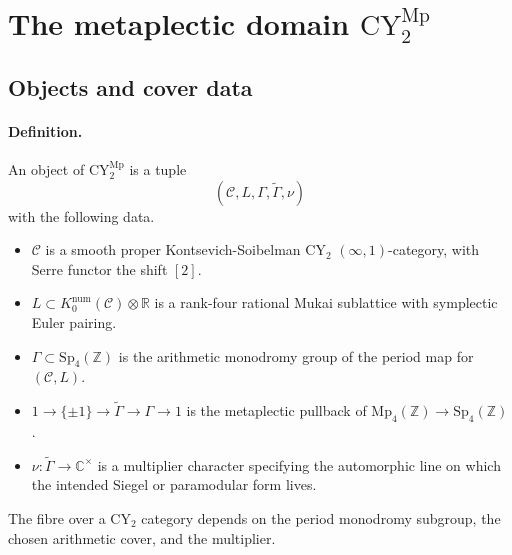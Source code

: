 \providecommand{\Sp}{\mathrm{Sp}}
\providecommand{\Mp}{\mathrm{Mp}}
\providecommand{\Z}{\mathbb{Z}}
\providecommand{\Q}{\mathbb{Q}}
\providecommand{\R}{\mathbb{R}}
\providecommand{\C}{\mathbb{C}}
\providecommand{\CY}{\mathrm{CY}}
\providecommand{\SVOA}{\mathrm{SVOA}}
\providecommand{\VOA}{\mathrm{VOA}}
\providecommand{\NS}{\mathrm{NS}}
\providecommand{\ChirAlg}{\mathrm{ChirAlg}}
\providecommand{\Per}{\mathrm{Per}}
\providecommand{\Aut}{\mathrm{Aut}}
\providecommand{\id}{\mathrm{id}}
\providecommand{\Mod}{\mathrm{Mod}}
\providecommand{\kBKM}{\kappa_{\mathrm{BKM}}}
\providecommand{\Phisup}{\Phi^{\mathrm{sup}}}
\providecommand{\CYMp}{\CY_2^{\Mp}}
\providecommand{\CYint}{\CY_2^{\mathrm{int}}}
\providecommand{\CYhalf}{\CY_2^{\mathrm{half}}}
\providecommand{\cC}{\mathcal{C}}
\providecommand{\cK}{\mathcal{K}}
\providecommand{\cL}{\mathcal{L}}

\section{The metaplectic domain \(\CYMp\)}
\label{sec:CY2-Mp-domain}

\subsection*{Objects and cover data}

\paragraph{Definition.}
An object of \(\CYMp\) is a tuple
\[
  (\cC,L,\Gamma,\widetilde{\Gamma},\nu)
\]
with the following data.
\begin{itemize}
\item \(\cC\) is a smooth proper Kontsevich-Soibelman CY\(_2\)
  \((\infty,1)\)-category, with Serre functor the shift \([2]\).
\item \(L\subset K_0^{\mathrm{num}}(\cC)\otimes\R\) is a rank-four
  rational Mukai sublattice with symplectic Euler pairing.
\item \(\Gamma\subset\Sp_4(\Z)\) is the arithmetic monodromy group of
  the period map for \((\cC,L)\).
\item
  \(1\to\{\pm1\}\to\widetilde{\Gamma}\to\Gamma\to1\)
  is the metaplectic pullback of \(\Mp_4(\Z)\to\Sp_4(\Z)\).
\item \(\nu:\widetilde{\Gamma}\to\C^\times\) is a multiplier character
  specifying the automorphic line on which the intended Siegel or
  paramodular form lives.
\end{itemize}
The fibre over a CY\(_2\) category depends on the period monodromy
subgroup, the chosen arithmetic cover, and the multiplier.

